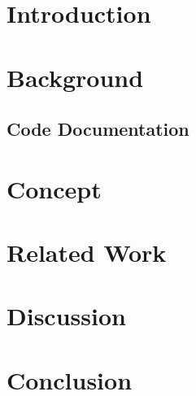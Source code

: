 \section{Introduction}

\section{Background}

\subsection{Code Documentation}

\section{Concept}

\section{Related Work}

\section{Discussion}

\section{Conclusion}

